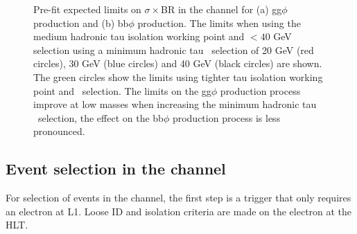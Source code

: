 \begin{figure}[h!]
\begin{center}
\end{center}
\caption{Pre-fit expected limits on $\sigma\times$BR in the \mutau channel for (a) gg$\phi$ production and (b) bb$\phi$ production. The
limits when using the medium hadronic tau isolation working point and \mT$<40$ GeV selection using a minimum
hadronic tau \pT~selection of 20 GeV (red circles), 30 GeV (blue circles) and 40 GeV (black circles) are shown. The green
circles show the limits using tighter tau isolation working point and \mT~selection. The limits on
the gg$\phi$ production process improve at low masses when increasing the minimum hadronic tau \pT~selection,
the effect on the bb$\phi$ production process is less pronounced.}
\label{fig:mssm_tauptcut}
\end{figure}


\subsection{\texorpdfstring{Event selection in the \etau channel}{Event selection in the e tau channel}}
\label{sec:mssm_eventsel_et}
For selection of events in the \etau channel, the first step is
a trigger that only requires an electron at \ac{L1}. Loose ID and isolation
criteria are made on the electron at the \ac{HLT}.

